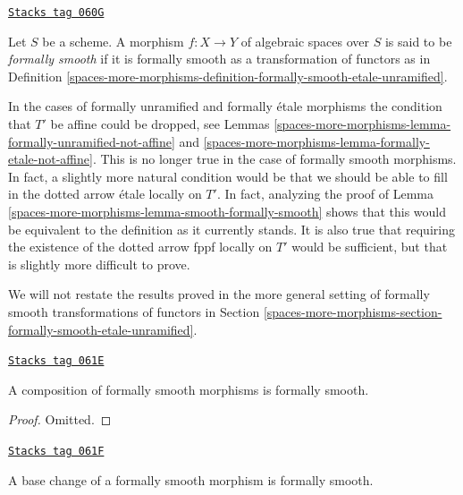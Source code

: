 \begin{definition}
\label{spaces-more-morphisms-definition-formally-smooth}
\href{https://stacks.math.columbia.edu/tag/060G}{\texttt{Stacks tag 060G}}

Let $S$ be a scheme. A morphism $f : X \to Y$ of algebraic spaces over $S$
is said to be {\it formally smooth} if it is formally smooth as a
transformation of functors as in
Definition \ref{spaces-more-morphisms-definition-formally-smooth-etale-unramified}.
\end{definition}

In the cases of formally unramified and formally \'etale morphisms
the condition that $T'$ be affine could be dropped, see
Lemmas \ref{spaces-more-morphisms-lemma-formally-unramified-not-affine} and
\ref{spaces-more-morphisms-lemma-formally-etale-not-affine}.
This is no longer true in the case of formally smooth morphisms.
In fact, a slightly more natural condition would be that we should be
able to fill in the dotted arrow \'etale locally on $T'$.
In fact, analyzing the proof of
Lemma \ref{spaces-more-morphisms-lemma-smooth-formally-smooth}
shows that this would be equivalent to the definition as it currently
stands. It is also true that requiring the existence of the dotted
arrow fppf locally on $T'$ would be sufficient, but that is slightly
more difficult to prove.

\medskip\noindent
We will not restate the results proved in the more general setting of
formally smooth transformations of functors in
Section \ref{spaces-more-morphisms-section-formally-smooth-etale-unramified}.

\begin{lemma}
\label{spaces-more-morphisms-lemma-composition-formally-smooth}
\href{https://stacks.math.columbia.edu/tag/061E}{\texttt{Stacks tag 061E}}

A composition of formally smooth morphisms is formally smooth.
\end{lemma}

\begin{proof}
Omitted.
\end{proof}

\begin{lemma}
\label{spaces-more-morphisms-lemma-base-change-formally-smooth}
\href{https://stacks.math.columbia.edu/tag/061F}{\texttt{Stacks tag 061F}}

A base change of a formally smooth morphism is formally smooth.
\end{lemma}


